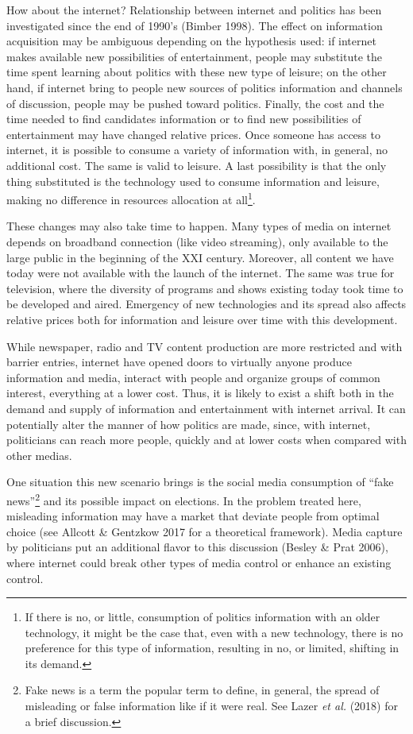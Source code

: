 \documentclass[
  12pt,
]{article}
\begin{document}
How about the internet? Relationship between internet and politics has
been investigated since the end of 1990's (Bimber 1998). The effect on
information acquisition may be ambiguous depending on the hypothesis
used: if internet makes available new possibilities of entertainment,
people may substitute the time spent learning about politics with these
new type of leisure; on the other hand, if internet bring to people new
sources of politics information and channels of discussion, people may
be pushed toward politics. Finally, the cost and the time needed to find
candidates information or to find new possibilities of entertainment may
have changed relative prices. Once someone has access to internet, it is
possible to consume a variety of information with, in general, no
additional cost. The same is valid to leisure. A last possibility is
that the only thing substituted is the technology used to consume
information and leisure, making no difference in resources allocation at
all\footnote{If there is no, or little, consumption of politics
  information with an older technology, it might be the case that, even
  with a new technology, there is no preference for this type of
  information, resulting in no, or limited, shifting in its demand.}.

These changes may also take time to happen. Many types of media on
internet depends on broadband connection (like video streaming), only
available to the large public in the beginning of the XXI century.
Moreover, all content we have today were not available with the launch
of the internet. The same was true for television, where the diversity
of programs and shows existing today took time to be developed and
aired. Emergency of new technologies and its spread also affects
relative prices both for information and leisure over time with this
development.

While newspaper, radio and TV content production are more restricted and
with barrier entries, internet have opened doors to virtually anyone
produce information and media, interact with people and organize groups
of common interest, everything at a lower cost. Thus, it is likely to
exist a shift both in the demand and supply of information and
entertainment with internet arrival. It can potentially alter the manner
of how politics are made, since, with internet, politicians can reach
more people, quickly and at lower costs when compared with other medias.

One situation this new scenario brings is the social media consumption
of ``fake news''\footnote{Fake news is a term the popular term to
  define, in general, the spread of misleading or false information like
  if it were real. See Lazer \emph{et al.} (2018) for a brief
  discussion.} and its possible impact on elections. In the problem
treated here, misleading information may have a market that deviate
people from optimal choice (see Allcott \& Gentzkow 2017 for a
theoretical framework). Media capture by politicians put an additional
flavor to this discussion (Besley \& Prat 2006), where internet could
break other types of media control or enhance an existing control.
\end{document}
